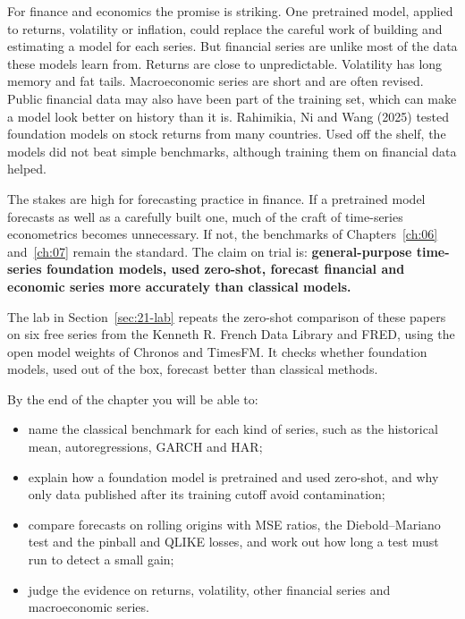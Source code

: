 For finance and economics the promise is striking. One pretrained model, applied to returns, volatility or inflation, could replace the careful work of building and estimating a model for each series. But financial series are unlike most of the data these models learn from. Returns are close to unpredictable. Volatility has long memory and fat tails. Macroeconomic series are short and are often revised. Public financial data may also have been part of the training set, which can make a model look better on history than it is. Rahimikia, Ni and Wang (2025) tested foundation models on stock returns from many countries. Used off the shelf, the models did not beat simple benchmarks, although training them on financial data helped.

The stakes are high for forecasting practice in finance. If a pretrained model forecasts as well as a carefully built one, much of the craft of time-series econometrics becomes unnecessary. If not, the benchmarks of Chapters~\ref{ch:06} and~\ref{ch:07} remain the standard. The claim on trial is: \textbf{general-purpose time-series foundation models, used zero-shot, forecast financial and economic series more accurately than classical models.}

The lab in Section~\ref{sec:21-lab} repeats the zero-shot comparison of these papers on six free series from the Kenneth R. French Data Library and FRED, using the open model weights of Chronos and TimesFM. It checks whether foundation models, used out of the box, forecast better than classical methods.

By the end of the chapter you will be able to:

\begin{itemize}
  \item name the classical benchmark for each kind of series, such as the historical mean, autoregressions, GARCH and HAR;
  \item explain how a foundation model is pretrained and used zero-shot, and why only data published after its training cutoff avoid contamination;
  \item compare forecasts on rolling origins with MSE ratios, the Diebold--Mariano test and the pinball and QLIKE losses, and work out how long a test must run to detect a small gain;
  \item judge the evidence on returns, volatility, other financial series and macroeconomic series.
\end{itemize}



